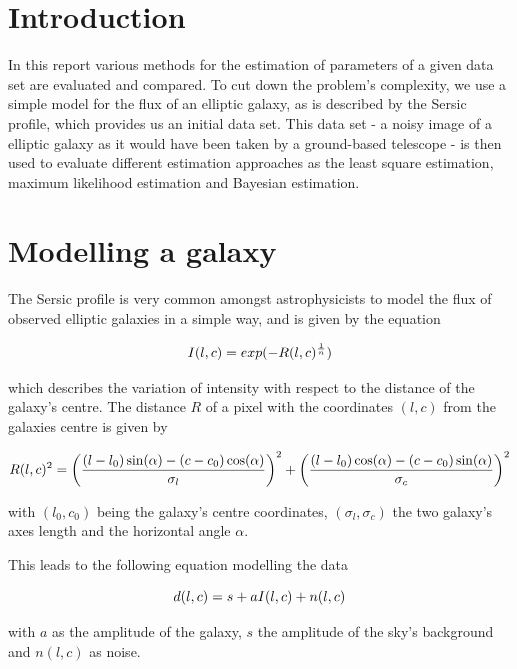 
\section{Introduction}
In this report various methods for the estimation of parameters of a given data set are evaluated and compared. To cut down the problem's complexity, we use a simple model for the flux of an elliptic galaxy, as is described by the Sersic profile, which provides us an initial data set. This data set - a noisy image of a elliptic galaxy as it would have been taken by a ground-based telescope - is then used to evaluate different estimation approaches as the least square estimation, maximum likelihood estimation and Bayesian estimation.\\

\section{Modelling a galaxy}
The Sersic profile is very common amongst astrophysicists to model the flux of observed elliptic galaxies in a simple way, and is given by the equation

\begin{equation}
	\centering
	I(l,c) = exp(-R(l,c)^{\frac{1}{n}})
\end{equation}

which describes the variation of intensity with respect to the distance of the galaxy's centre.
The distance $R$ of a pixel with the coordinates $(l,c)$ from the galaxies centre is given by 

\begin{equation}
	\centering
	R(l,c)^2 = \bigg(\frac{(l-l_0)\sin(\alpha) - (c - c_0)\cos(\alpha)}{\sigma_l}\bigg)^2 + \bigg(\frac{(l-l_0)\cos(\alpha) - (c - c_0)\sin(\alpha)}{\sigma_c}\bigg)^2
\end{equation}

with $(l_0,c_0)$ being the galaxy's centre coordinates, $(\sigma_l,\sigma_c)$ the two galaxy's axes length and the horizontal angle $\alpha$.

This leads to the following equation modelling the data

\begin{equation}
	\centering
	d(l,c) = s + a I(l,c) + n(l,c)
\end{equation}

with $a$ as the amplitude of the galaxy, $s$ the amplitude of the sky's background and $n(l,c)$ as noise.

